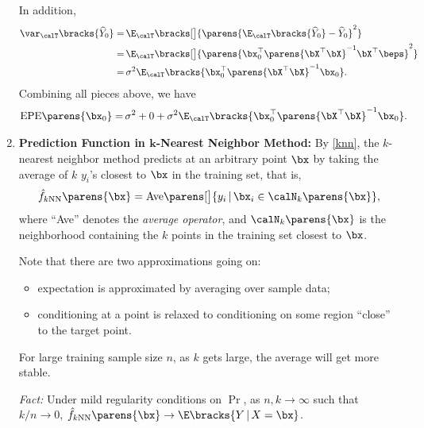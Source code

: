 \documentclass[12pt]{article}
\begin{document}
\begin{enumerate}[label=\textbf{\arabic*.}]
	In addition, 
	\begin{align*}
		\var_{\calT} \bracks{\widehat{Y}_0} = & \, \E_{\calT} \bracks[\big]{ \parens{ \E_{\calT} \bracks{\widehat{Y}_0} - \widehat{Y}_0}^2 } \\ 
		= & \,  \E_{\calT} \bracks[\big]{ \parens{ \bx_0^\top \parens{\bX^\top \bX}^{-1} \bX^\top \beps }^2 }  \\ 
		= & \, \sigma^2 \E_{\calT} \bracks{ \bx_0^\top \parens{\bX^\top \bX}^{-1} \bx_0}. 
	\end{align*}
	Combining all pieces above, we have 
	\begin{align*}
		\mathrm{EPE} \parens{\bx_0} = & \, \sigma^2 + 0 + \sigma^2 \E_{\calT} \bracks{ \bx_0^\top \parens{\bX^\top \bX}^{-1} \bx_0}. 
	\end{align*}
	
	\item \textbf{Prediction Function in $\boldsymbol{k}$-Nearest Neighbor Method:} By \eqref{knn}, the $k$-nearest neighbor method predicts at an arbitrary point $\bx$ by taking the average of $k$ $y_i$'s closest to $\bx$ in the training set, that is, 
	\begin{equation}
		\hat{f}_{k\mathrm{NN}} \parens{\bx} = \mathrm{Ave} \parens[\big]{y_i \,\vert\, \bx_i \in \calN_k \parens{\bx}}, 
	\end{equation} 
	where ``Ave'' denotes the \emph{average operator}, and $\calN_k \parens{\bx}$ is the neighborhood containing the $k$ points in the training set closest to $\bx$. 
	
	Note that there are two approximations going on: 
	\begin{itemize}
		\item expectation is approximated by averaging over sample data; 
		\item conditioning at a point is relaxed to conditioning on some region ``close'' to the target point. 
	\end{itemize}
	For large training sample size $n$, as $k$ gets large, the average will get more stable. 
	
	\textit{Fact:} Under mild regularity conditions on $\Pr$, as $n, k \to \infty$ such that $k / n \to 0$, $\hat{f}_{k\mathrm{NN}} \parens{\bx} \to \E \bracks{Y \,\vert\, X = \bx}$. 
	

\end{enumerate}
\end{document}
